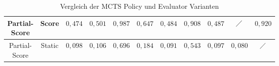 \begin{table}[H]
{\begin{tabular}{|c|c|c|c|c|c|c|c|c|c|c|}
            \tiny \makecell{Partial-                                                                                                                                                                                                                                                                                                                                                              \\Score} &         Score & \cellcolor[HTML]{fee482}$0{,}474$ & \cellcolor[HTML]{ffeb84}$0{,}501$ & \cellcolor[HTML]{68c07c}$0{,}987$ & \cellcolor[HTML]{d2de82}$0{,}647$ & \cellcolor[HTML]{fee683}$0{,}484$ & \cellcolor[HTML]{80c77d}$0{,}908$ & \cellcolor[HTML]{fee783}$0{,}487$ & $\diagup$                         & \cellcolor[HTML]{7cc67d}$0{,}920$ \\ \hline
            \tiny \makecell{Partial-                                                                                                                                                                                                                                                                                                                                                              \\Score} &        Static & \cellcolor[HTML]{f9826f}$0{,}098$ & \cellcolor[HTML]{f98470}$0{,}106$ & \cellcolor[HTML]{c2da81}$0{,}696$ & \cellcolor[HTML]{fa9874}$0{,}184$ & \cellcolor[HTML]{f9806f}$0{,}091$ & \cellcolor[HTML]{f2e884}$0{,}543$ & \cellcolor[HTML]{f9826f}$0{,}097$ & \cellcolor[HTML]{f97d6e}$0{,}080$ & $\diagup$                         \\ \hline
        \end{tabular}}
    \vspace{3pt}
    \caption{Vergleich der \acs{MCTS} Policy und Evaluator Varianten}
    \label{tabelle:mcts-policy-eval-comparision}
\end{table}

